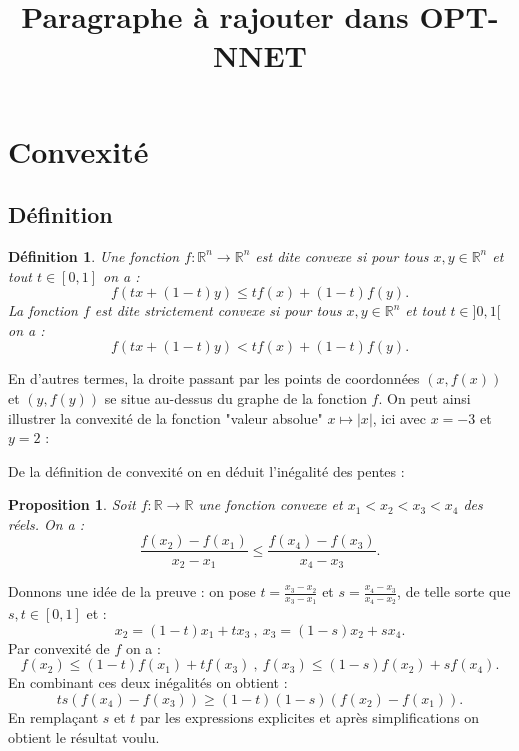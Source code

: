 \documentclass[a4paper]{book}
\title{\Huge \bf Paragraphe à rajouter dans OPT-NNET}
\newtheorem{definition}{D\'efinition}
\newtheorem{proposition}{Proposition}
\newcommand{\Rr}{\mathbb{R}}
\begin{document}
 
\section{Convexité}


\subsection{Définition}

\begin{definition}
Une fonction $f : \Rr^n \to \Rr^n$ est dite convexe si pour tous $x,y \in \Rr^n$ et tout $t \in [0,1]$ on a : $$f(tx+(1-t)y) \le t f(x) + (1-t) f(y).$$ La fonction $f$ est dite strictement convexe si pour tous $x,y \in \Rr^n$ et tout $t \in ]0,1[$ on a : $$f(tx+(1-t)y) < t f(x) + (1-t) f(y).$$
\end{definition}

En d'autres termes, la droite passant par les points de coordonnées $(x,f(x))$ et $(y,f(y))$ se situe au-dessus du graphe de la fonction $f$. On peut ainsi illustrer la convexité de la fonction "valeur absolue" $x \mapsto |x|$, ici avec $x=-3$ et $y=2$ : 

\bigskip
 
\begin{center}
\end{center}

De la définition de convexité on en déduit l'inégalité des pentes :

\begin{proposition}
Soit $f : \Rr \to \Rr$ une fonction convexe et $x_1<x_2<x_3<x_4$ des réels. On a : $$\frac{f(x_2)-f(x_1)}{x_2-x_1} \le \frac{f(x_4)-f(x_3)}{x_4-x_3}.$$
\end{proposition}

Donnons une idée de la preuve : on pose $t = \frac{x_3-x_2}{x_3-x_1}$ et $s = \frac{x_4-x_3}{x_4-x_2}$, de telle sorte que $s,t \in [0,1]$ et : $$x_2 = (1-t)x_1+t x_3 \ , \ x_3 = (1-s) x_2+s x_4.$$ Par convexité de $f$ on a : $$f(x_2) \le (1-t) f(x_1)+t f(x_3) \ , \ f(x_3) \le (1-s) f(x_2)+s f(x_4).$$ En combinant ces deux inégalités on obtient : $$ts(f(x_4)-f(x_3)) \geq (1-t) (1-s) (f(x_2)-f(x_1)).$$ En remplaçant $s$ et $t$ par les expressions explicites et après simplifications on obtient le résultat voulu.
\end{document}
